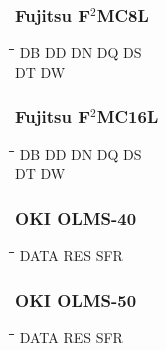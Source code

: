 \subsubsection{Fujitsu F$^{2}$MC8L}
{\tt\begin{tabbing} 
\hspace{3cm}\=\hspace{3cm}\=\hspace{3cm}\=\hspace{3cm}\=\kill
DB         \> DD          \> DN          \> DQ          \> DS \\
DT         \> DW \\
\end{tabbing}}

\subsubsection{Fujitsu F$^{2}$MC16L}
{\tt\begin{tabbing} 
\hspace{3cm}\=\hspace{3cm}\=\hspace{3cm}\=\hspace{3cm}\=\kill
DB         \> DD          \> DN          \> DQ          \> DS \\
DT         \> DW \\
\end{tabbing}}

\subsubsection{OKI OLMS-40}
{\tt\begin{tabbing} 
\hspace{3cm}\=\hspace{3cm}\=\hspace{3cm}\=\hspace{3cm}\=\kill
DATA       \> RES         \> SFR \\
\end{tabbing}}

\subsubsection{OKI OLMS-50}
{\tt\begin{tabbing} 
\hspace{3cm}\=\hspace{3cm}\=\hspace{3cm}\=\hspace{3cm}\=\kill
DATA       \> RES         \> SFR \\
\end{tabbing}}

